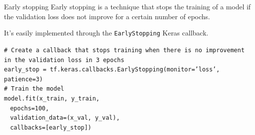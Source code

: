 \documentclass[9pt, aspectratio=169]{beamer}
\begin{document}
\begin{frame}
    {Early stopping}
    Early stopping is a technique that stops the training of a model if the validation loss does not improve for a certain number of epochs.

    It's easily implemented through the \texttt{EarlyStopping} Keras callback.

    \begin{codebox}
        \texttt{\# Create a callback that stops training when there is no improvement in the validation loss in 3 epochs\\
            early\_stop = tf.keras.callbacks.EarlyStopping(monitor='loss', patience=3)\\
            \# Train the model\\
            model.fit(x\_train, y\_train,\\
            $~~~~$epochs=100,\\
            $~~~~$validation\_data=(x\_val, y\_val),\\
            $~~~~$callbacks=[early\_stop])
        }
    \end{codebox}

\end{frame}
\end{document}
